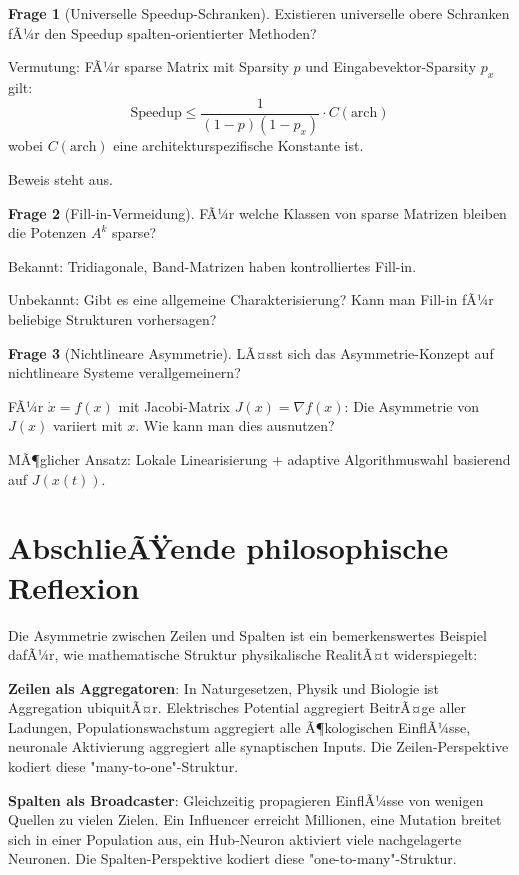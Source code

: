 ﻿\documentclass[a4paper,12pt]{report}
\theoremstyle{definition}
\newtheorem{frage}{Frage}
\begin{document}
	\begin{frage}[Universelle Speedup-Schranken]
		Existieren universelle obere Schranken fÃ¼r den Speedup spalten-orientierter Methoden?
		
		Vermutung: FÃ¼r sparse Matrix mit Sparsity $p$ und Eingabevektor-Sparsity $p_x$ gilt:
		\[
		\text{Speedup} \leq \frac{1}{(1-p)(1-p_x)} \cdot C(\text{arch})
		\]
		wobei $C(\text{arch})$ eine architekturspezifische Konstante ist.
		
		Beweis steht aus.
	\end{frage}
	
	\begin{frage}[Fill-in-Vermeidung]
		FÃ¼r welche Klassen von sparse Matrizen bleiben die Potenzen $A^k$ sparse?
		
		Bekannt: Tridiagonale, Band-Matrizen haben kontrolliertes Fill-in.
		
		Unbekannt: Gibt es eine allgemeine Charakterisierung? Kann man Fill-in fÃ¼r beliebige Strukturen vorhersagen?
	\end{frage}
	
	\begin{frage}[Nichtlineare Asymmetrie]
		LÃ¤sst sich das Asymmetrie-Konzept auf nichtlineare Systeme verallgemeinern?
		
		FÃ¼r $\dot{x} = f(x)$ mit Jacobi-Matrix $J(x) = \nabla f(x)$: Die Asymmetrie von $J(x)$ variiert mit $x$. Wie kann man dies ausnutzen?
		
		MÃ¶glicher Ansatz: Lokale Linearisierung + adaptive Algorithmuswahl basierend auf $J(x(t))$.
	\end{frage}
	
	\section{AbschlieÃŸende philosophische Reflexion}
	
	Die Asymmetrie zwischen Zeilen und Spalten ist ein bemerkenswertes Beispiel dafÃ¼r, wie mathematische Struktur physikalische RealitÃ¤t widerspiegelt:
	
	\textbf{Zeilen als Aggregatoren}: In Naturgesetzen, Physik und Biologie ist Aggregation ubiquitÃ¤r. Elektrisches Potential aggregiert BeitrÃ¤ge aller Ladungen, Populationswachstum aggregiert alle Ã¶kologischen EinflÃ¼sse, neuronale Aktivierung aggregiert alle synaptischen Inputs. Die Zeilen-Perspektive kodiert diese "many-to-one"-Struktur.
	
	\textbf{Spalten als Broadcaster}: Gleichzeitig propagieren EinflÃ¼sse von wenigen Quellen zu vielen Zielen. Ein Influencer erreicht Millionen, eine Mutation breitet sich in einer Population aus, ein Hub-Neuron aktiviert viele nachgelagerte Neuronen. Die Spalten-Perspektive kodiert diese "one-to-many"-Struktur.
	
\end{document}

